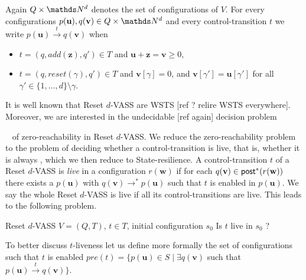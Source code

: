 Again $Q \times \N^d$
 denotes the set of configurations of $V$.
For every configurations $p(\textbf{u}), q(\textbf{v}) \in Q \times \N^d$ and every control-transition $t$ we write
$p(\textbf{u}) \xrightarrow{t} q(\textbf{v})$ when 

\begin{itemize}

\item  $t = (q,add(\textbf{z}),q') \in T$
and $\textbf{u}+\textbf{z} = \textbf{v} \geq 0$,

\item $t = (q,reset(\gamma),q') \in T$ 
and
$\textbf{v}[\gamma] = 0$, and $\textbf{v}[\gamma'] = \textbf{u}[\gamma']$ for all $\gamma' \in \{1,\ldots, d\} \setminus \gamma$.
\end{itemize}

It is well known that Reset $d$-VASS are WSTS [ref ? relire WSTS everywhere]. 
Moreover, we are interested in the 
 undecidable [ref again] decision problem%
\iffalse
\alain{ce qui suit est inutile}

\begin{samepage}
\problemx{Zero-reachability}
{A Reset $d$-VASS $V=(Q,T)$, $q(\textbf{u}) \in Q \times \N^d$}
{$\exists p \in Q ~ q(\textbf{u}) \to^* p(\textbf{0})$? \\}
\end{samepage}
%
\alain{ce qui précède est inutile}
\fi
~ of zero-reachability in Reset $d$-VASS.
%
We reduce the zero-reachability problem to the problem of deciding whether a control-transition is live, that is, whether it is always ,
which we then reduce to {\sc State-resilience}.
A control-transition $t$ of a Reset $d$-VASS is {\em live} in a configuration $r(\textbf{w})$ if for each $q(\textbf{v}) \in \textsf{post}^*(r(\textbf{w}))$ there exists a 
 $p(\textbf{u})$ with $q(\textbf{v}) \to^* p(\textbf{u})$ such that $t$ is enabled in $p(\textbf{u})$. We say the whole Reset $d$-VASS is live if all its control-transitions are
live. This leads to the following problem.

{Reset $d$-VASS $V=(Q,T)$, $t \in T$, initial configuration $s_0$}
{Is $t$ live in $s_0$ ? \\}


To better discuss $t$-liveness let us define more formally the set of configurations such that $t$ is enabled
$pre(t)=\{ p(\textbf{u}) \in S \mid \exists q(\textbf{v})$ such that $ p(\textbf{u}) \xrightarrow{t} q(\textbf{v}) \}$.

